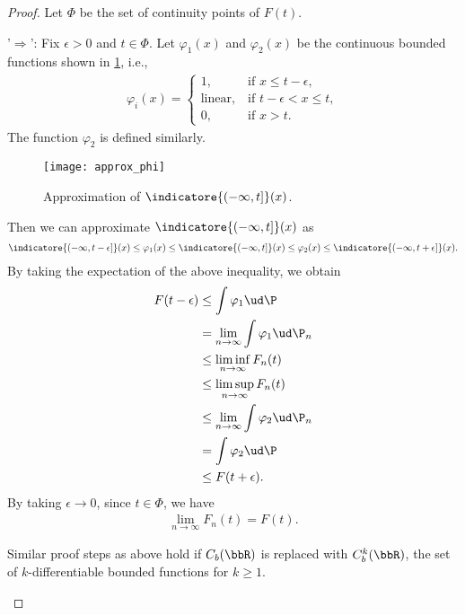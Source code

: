 \documentclass[../aipt.tex]{subfiles}
\begin{document}
\begin{proof}
Let $\Phi$ be the set of continuity points of $F(t)$.

'$\Rightarrow$':  Fix $\epsilon > 0$ and $t\in\Phi$. Let $\varphi_1(x)$ and $\varphi_2(x)$ be the continuous bounded functions shown in \cref{wk9:fig:varphi}, i.e., 
\begin{align*}
\varphi_i(x) =
\begin{cases}
1, &\ \text{if $x \leq t-\epsilon$},\\
\text{linear}, &\ \text{if $t-\epsilon < x \leq t$},\\
0, &\ \text{if $x>t$}.
\end{cases}
\end{align*}
The function $\varphi_2$ is defined similarly.

\begin{figure}[!htb]
\centering
\texttt{[image: approx\_phi]} 
\caption{Approximation of $\indicatore{\left(-\infty, t\right]}(x)$.}\label{wk9:fig:varphi} 
\end{figure}

Then we can approximate $\indicatore{\left(-\infty, t\right]}(x)$ as
\begin{align*}
\indicatore{\left(-\infty, t - \epsilon\right]}(x)
\leq \varphi_1(x)
\leq \indicatore{\left(-\infty, t\right]}(x)
\leq \varphi_2(x)
\leq \indicatore{\left(-\infty, t + \epsilon\right]}(x).
\end{align*}
By taking the expectation of the above inequality, we obtain
\begin{align*}
F(t - \epsilon)
& \leq \int \varphi_1 \ud\P \\
&= \lim_{n \to \infty} \int \varphi_1 \ud\P_n \\
& \leq \liminf_{n \to \infty} F_n(t) \\
& \leq \limsup_{n \to \infty} F_n(t) \\
& \leq \lim_{n \to \infty} \int \varphi_2 \ud\P_n \\
& = \int \varphi_2 \ud\P \\
& \leq F(t + \epsilon).
\end{align*}
By taking $\epsilon \to 0$, since $t\in\Phi$, we have
\begin{align*}
\lim_{n \to \infty} F_n(t) = F(t).
\end{align*}
%
\begin{Remark}
Similar proof steps as above hold if $C_b(\bbR)$ is replaced with $C_b^k(\bbR)$, the set of $k$-differentiable bounded functions for $k\geq1$.
\end{Remark}


\end{proof}
\end{document}
